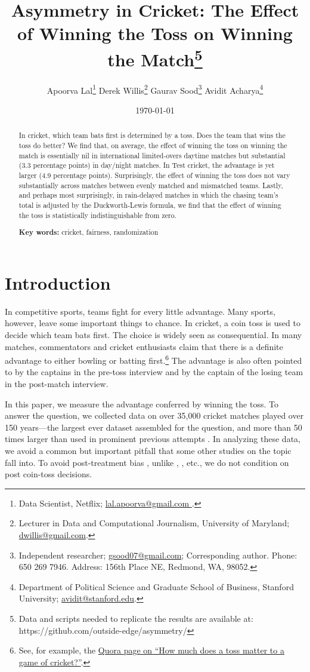 \documentclass[12pt, letterpaper]{article}
\title{Asymmetry in Cricket: The Effect of Winning the Toss on Winning the Match\thanks{Data and scripts needed to replicate the results are available at: https://github.com/outside-edge/asymmetry/}}
\author{
Apoorva Lal\thanks{Data Scientist, Netflix;  \href{mailto:lal.apoorva@gmail.com}{lal.apoorva@gmail.com }.} \;\;
Derek Willis\thanks{Lecturer in Data and Computational Journalism, University of Maryland;  \href{mailto:dwillis@gmail.com}{dwillis@gmail.com}.}  \;\;
Gaurav Sood\thanks{Independent researcher;  \href{mailto:gsood07@gmail.com}{gsood07@gmail.com}; Corresponding author. Phone: 650 269 7946. Address: 156th Place NE, Redmond, WA, 98052.}\;\;
Avidit Acharya\thanks{Department of Political Science and Graduate School of Business, Stanford University; \href{mailto:avidit@stanford.edu}{avidit@stanford.edu}.}
}
\date{\today}
\begin{document}
\maketitle
\doublespacing

\begin{abstract}

In cricket, which team bats first is determined by a toss. Does the team that wins the toss do better? We find that, on average, the effect of winning the toss on winning the match is essentially nil in international limited-overs daytime matches but substantial (3.3 percentage points) in day/night matches. In Test cricket, the advantage is yet larger (4.9 percentage points). Surprisingly, the effect of winning the toss does not vary substantially across matches between evenly matched and mismatched teams. Lastly, and perhaps most surprisingly, in rain-delayed matches in which the chasing team's total is adjusted by the Duckworth-Lewis formula, we find that the effect of winning the toss is statistically indistinguishable from zero.

\smallskip

\textbf{Key words:} cricket, fairness, randomization

\end{abstract}

\section{Introduction}

In competitive sports, teams fight for every little advantage. Many sports, however, leave some important things to chance. In cricket, a coin toss is used to decide which team bats first. The choice is widely seen as consequential. In many matches, commentators and cricket enthusiasts claim that there is a definite advantage to either bowling or batting first.\footnote{See, for example, the \href{https://www.quora.com/How-much-does-a-toss-matter-to-a-game-of-cricket}{Quora page on ``How much does a toss matter to a game of cricket?''}.} The advantage is also often pointed to by the captains in the pre-toss interview and by the captain of the losing team in the post-match interview.

In this paper, we measure the advantage conferred by winning the toss. To answer the question, we collected data on over 35,000 cricket matches played over 150 years---the largest ever dataset assembled for the question, and more than 50 times larger than used in prominent previous attempts \citep[see,][]{dawson2009bat, de1998winning}. In analyzing these data, we avoid a common but important pitfall that some other studies on the topic fall into. To avoid post-treatment bias \citep[see][]{acharya2015}, unlike \citet{dawson2009bat}, \citet{Saad2015}, etc., we do not condition on post coin-toss decisions. 
\end{document}
